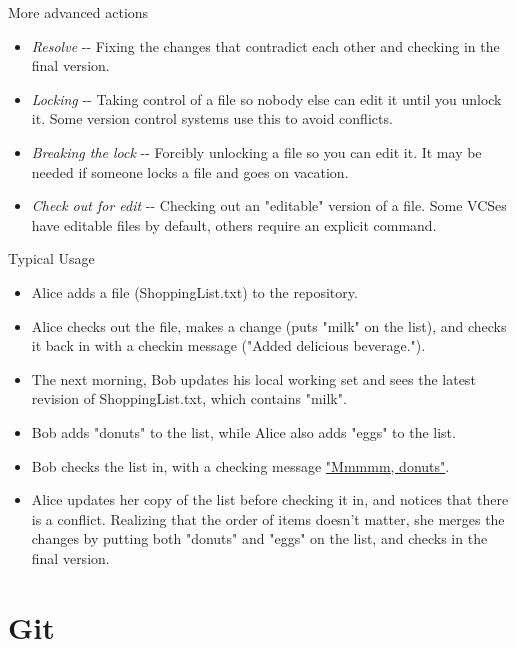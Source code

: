 \documentclass[aspectratio=169]{beamer}
\begin{document}
\begin{frame}{More advanced actions}

\begin{itemize}
\item
  \emph{Resolve} -\/- Fixing the changes that contradict each other and
  checking in the final version.
\item
  \emph{Locking} -\/- Taking control of a file so nobody else can edit
  it until you unlock it. Some version control systems use this to avoid
  conflicts.
\item
  \emph{Breaking the lock} -\/- Forcibly unlocking a file so you can
  edit it. It may be needed if someone locks a file and goes on
  vacation.
\item
  \emph{Check out for edit} -\/- Checking out an "editable" version of a
  file. Some VCSes have editable files by default, others require an
  explicit command.
\end{itemize}

\end{frame}

\begin{frame}{Typical Usage}

\begin{itemize}
\item
  Alice adds a file (ShoppingList.txt) to the repository.
\item
  Alice checks out the file, makes a change (puts "milk" on the list),
  and checks it back in with a checkin message ("Added delicious
  beverage.").
\item
  The next morning, Bob updates his local working set and sees the
  latest revision of ShoppingList.txt, which contains "milk".
\item
  Bob adds "donuts" to the list, while Alice also adds "eggs" to the
  list.
\item
  Bob checks the list in, with a checking message
  \href{https://www.youtube.com/watch?v=8-4P1WPE-Qg}{"Mmmmm, donuts"}.
\item
  Alice updates her copy of the list before checking it in, and notices
  that there is a conflict. Realizing that the order of items doesn't
  matter, she merges the changes by putting both "donuts" and "eggs" on
  the list, and checks in the final version.
\end{itemize}

\end{frame}

\section{Git}
\end{document}
